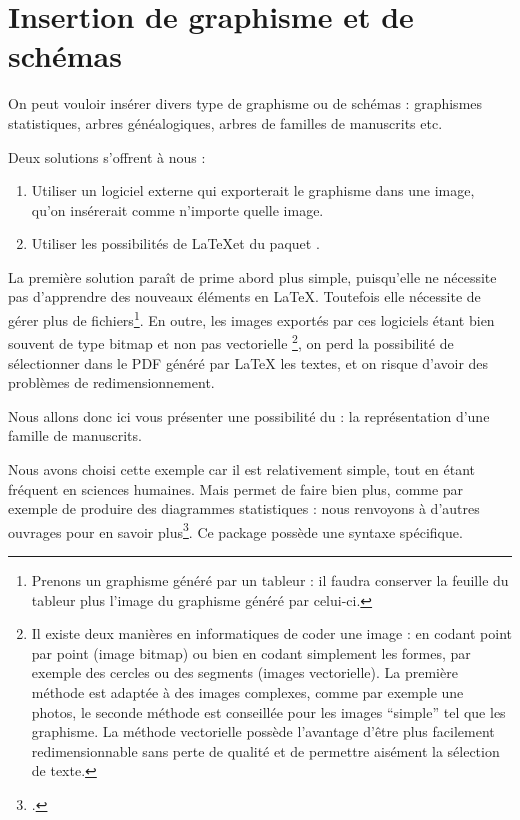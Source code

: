 \section{Insertion de graphisme et de schémas}

On peut vouloir insérer divers type de graphisme ou de schémas : graphismes statistiques, arbres généalogiques, arbres de familles de manuscrits etc.

Deux solutions s'offrent à nous :
\begin{enumerate}
\item Utiliser un logiciel externe qui exporterait le graphisme dans une image, qu'on insérerait comme n'importe quelle image.
\item Utiliser les possibilités de \LaTeX et du paquet .
\end{enumerate}

La première solution paraît de prime abord plus simple, puisqu'elle ne nécessite pas d'apprendre des nouveaux éléments en \LaTeX. Toutefois elle nécessite de gérer plus de fichiers\footnote{Prenons un graphisme généré par un tableur : il faudra conserver la feuille du tableur plus l'image du graphisme généré par celui-ci.}. En outre, les images exportés par ces logiciels étant bien souvent de type bitmap et non pas vectorielle%
\footnote{Il existe deux manières en informatiques de coder une image : en codant point par point (image bitmap) ou bien en codant simplement les formes, par exemple des cercles ou des segments (images vectorielle). La première méthode est adaptée à des images complexes, comme par exemple une photos,  le seconde méthode est conseillée pour les images \enquote{simple} tel que les graphisme. La méthode vectorielle possède l'avantage d'être plus facilement redimensionnable  sans perte de qualité et de permettre aisément la sélection de texte.},
on perd la possibilité de sélectionner dans le PDF généré par LaTeX les textes, et on risque d'avoir des problèmes de redimensionnement.

Nous allons donc ici vous présenter une possibilité du  : la représentation d'une famille de manuscrits. 

Nous avons choisi cette exemple car il est relativement simple, tout en étant fréquent en sciences humaines. Mais  permet de faire bien plus, comme par exemple de produire des diagrammes statistiques : nous renvoyons à d'autres ouvrages pour en savoir plus\footcites[Outre le manuel on pourra lire][]{tikzimpatient}[on pourra également consulter le site ][]{tikzexample}.
Ce package possède une syntaxe spécifique. 

